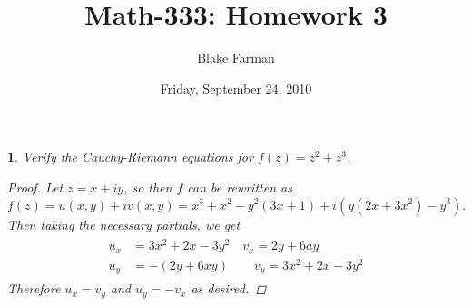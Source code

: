 \documentclass[10pt]{amsart}
\author{Blake Farman}
\title{Math-333: Homework 3\\}
\date{Friday, September 24, 2010}\pdfpagewidth 8.5in
\begin{document}
\maketitle
\renewcommand{\qedsymbol}{\(\blacksquare\)}


\newcommand{\Z}{\mathbb{Z}}
\newcommand{\R}{\mathbb{R}}
\newcommand{\Q}{\mathbb{Q}}
\newcommand{\C}{\mathbb{C}}

\renewcommand{\phi}{\varphi}
\newenvironment{alphaenum}{
  \begin{enumerate}
    \renewcommand{\theenumi}{(\alph{enumi})}
    \renewcommand{\labelenumi}{\theenumi}
  }
  {\end{enumerate}}
\newtheorem{thm}{}

\begin{thm}
  \label{Ex1}
  Verify the Cauchy-Riemann equations for $f(z) = z^2 + z^3$.
  \begin{proof}
    Let $z = x+iy$, so then $f$ can be rewritten as 
    $$f(z) = u(x,y) + iv(x,y) = x^3 + x^2 - y^2(3x+1) + i(y(2x+3x^2) - y^3).$$
    Then taking the necessary partials, we get
    \begin{align*}
      \begin{split}
        u_x &= 3x^2 + 2x - 3y^2 \quad  v_x = 2y + 6ay\\
        u_y &= -(2y + 6xy)  \quad \quad v_y = 3x^2 + 2x - 3y^2
      \end{split}
    \end{align*}
    Therefore $u_x = v_y$ and $u_y = -v_x$ as desired.
  \end{proof}
\end{thm}
\end{document}

